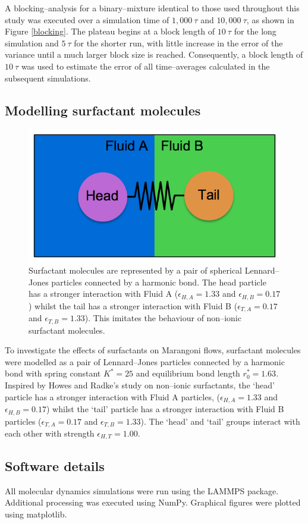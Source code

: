 A blocking--analysis for a binary--mixture identical to those used throughout this study was executed over a simulation time of $1,000\ \tau$ and $10,000\ \tau$, as shown in Figure \ref{blocking}.
The plateau begins at a block length of $10\ \tau$ for the long simulation and $5\ \tau$ for the shorter run, with little increase in the error of the variance until a much larger block size is reached.
Consequently, a block length of $10\ \tau$ was used to estimate the error of all time--averages calculated in the subsequent simulations.
\FloatBarrier

\subsection{Modelling surfactant molecules}\label{ModellingSurfactants}
\begin{figure}[h]
\centering
\includegraphics[scale=0.4]{surfactant.png}
\caption{Surfactant molecules are represented by a pair of spherical Lennard--Jones particles connected by a harmonic bond. 
The head particle has a stronger interaction with Fluid A ($\epsilon_{H, A} = 1.33$ and $\epsilon_{H, B} = 0.17$) whilst the tail has a stronger interaction with Fluid B ($\epsilon_{T, A} = 0.17$ and $\epsilon_{T, B} = 1.33$).
This imitates the behaviour of non--ionic surfactant molecules.
 }
\label{surfactant}
\end{figure}
To investigate the effects of surfactants on Marangoni flows, surfactant molecules were modelled as a pair of Lennard--Jones particles connected by a harmonic bond with spring constant $K^{*} = 25$ and equilibrium bond length $r^{*}_{0}=1.63$.
Inspired by Howes and Radke's study on non--ionic surfactants,\cite{HowesSurfactant} the `head' particle has a stronger interaction with Fluid A particles, ($\epsilon_{H, A} = 1.33$ and $\epsilon_{H, B} = 0.17$) whilst the `tail' particle has a stronger interaction with Fluid B particles ($\epsilon_{T, A} = 0.17$ and $\epsilon_{T, B} = 1.33$).
The `head' and `tail' groups interact with each other with strength $\epsilon_{H, T} = 1.00$.
\FloatBarrier

\subsection{Software details}\label{SoftwareDetails}
All molecular dynamics simulations were run using the LAMMPS package.\cite{LAMMPS}
Additional processing was executed using NumPy.\cite{NumPy}
Graphical figures were plotted using matplotlib.\cite{MatPlotLib}

